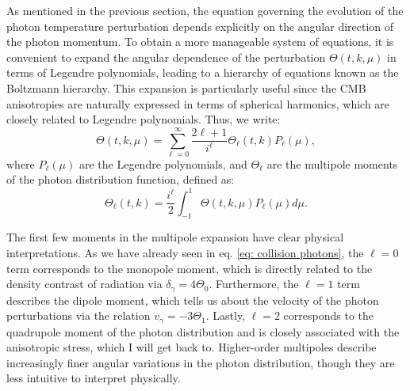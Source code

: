 \documentclass{aa}
\numberwithin{equation}{section}
\numberwithin{table}{section}
\numberwithin{figure}{section}
\begin{document}
As mentioned in the previous section, the equation governing the evolution of the photon temperature perturbation depends explicitly on the angular direction of the photon momentum. To obtain a more manageable system of equations, it is convenient to expand the angular dependence of the perturbation $\Theta(t, k, \mu)$ in terms of Legendre polynomials, leading to a hierarchy of equations known as the Boltzmann hierarchy. This expansion is particularly useful since the CMB anisotropies are naturally expressed in terms of spherical harmonics, which are closely related to Legendre polynomials. Thus, we write:
\begin{equation} 
  \Theta(t, k, \mu) = \sum_{\ell=0}^{\infty} \frac{2\ell+1}{i^\ell} \Theta_\ell(t, k) P_\ell(\mu), 
\end{equation}
where $P_\ell(\mu)$ are the Legendre polynomials, and $\Theta_\ell$ are the multipole moments of the photon distribution function, defined as:
\begin{equation} 
  \Theta_\ell(t, k) = \frac{i^\ell}{2} \int_{-1}^{1} \Theta(t, k, \mu) P_\ell(\mu) d\mu. 
\end{equation}

The first few moments in the multipole expansion have clear physical interpretations. As we have already seen in eq. \eqref{eq: collision photons}, the $\ell=0$ term corresponds to the monopole moment, which is directly related to the density contrast of radiation via $\delta_\gamma = 4\Theta_0$. Furthermore, the $\ell=1$ term describes the dipole moment, which tells us about the velocity of the photon perturbations via the relation $v_\gamma = -3\Theta_1$. Lastly, $\ell=2$ corresponds to the quadrupole moment of the photon distribution and is closely associated with the anisotropic stress, which I will get back to. Higher-order multipoles describe increasingly finer angular variations in the photon distribution, though they are less intuitive to interpret physically. 
\end{document}
